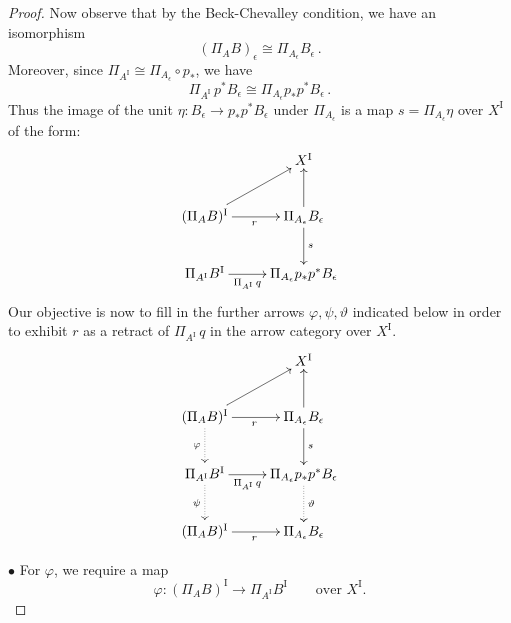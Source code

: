 \documentclass[12pt]{article}
\newcommand{\ra}{\ensuremath{\rightarrow}}
\newcommand{\I}{\ensuremath{\mathrm{I}}}
\theoremstyle{remark}
\theoremstyle{definition}
\begin{document}
\begin{proof}
Now observe that by the Beck-Chevalley condition, we have an isomorphism 
\[
(\Pi_AB )_\epsilon \cong \Pi_{A_\epsilon} B_\epsilon \,.
\]
Moreover, since $\Pi_{A^\I} \cong \Pi_{A_\epsilon} \circ p_*$, we have
\[
 \Pi_{A^\I}\,p^*B_\epsilon \cong \Pi_{A_\epsilon} p_*p^* B_\epsilon \,.
\]
Thus the image of the unit $\eta : B_\epsilon \ra p_*p^* B_\epsilon$ under $\Pi_{A_\epsilon}$ is a map 
$s = \Pi_{A_\epsilon}\eta$ over $X^\I$ of the form:
\begin{equation}\label{diagram:frobenius3}
\xymatrix{
& X^\I  \\
 (\Pi_AB)^\I  \ar[r]_r   \ar[ru] & \Pi_{A_\epsilon}B_\epsilon  \ar[u] \ar[d]^{s}\\
 \Pi_{A^\I}B^\I \ar[r]_-{\Pi_{A^\I}\,q} & \Pi_{A_\epsilon} p_*p^* B_\epsilon
}
\end{equation}
Our objective is now to fill in the further arrows $\varphi, \psi,\vartheta$ indicated below in order to exhibit $r$ as a retract of $\Pi_{A^\I}\,q$ in the arrow category over $X^\I$.
\begin{equation}\label{diagram:frobenius4}
\xymatrix{
& X^\I  \\
 (\Pi_AB)^\I  \ar[r]_r  \ar[ru] \ar@{..>}[d]_\varphi & \Pi_{A_\epsilon}B_\epsilon  \ar[u] \ar[d]^{s}\\
 \Pi_{A^\I}B^\I \ar[r]_-{\Pi_{A^\I}\,q} \ar@{..>}[d]_\psi & \Pi_{A_\epsilon} p_*p^* B_\epsilon \ar@{..>}[d]^\vartheta\\
  (\Pi_AB)^\I  \ar[r]_r  & \Pi_{A_\epsilon}B_\epsilon
}
\end{equation}

\smallskip

\noindent $\bullet$ For $\varphi$, we require a map 
\[
\varphi : (\Pi_AB)^\I \ra \Pi_{A^\I}B^\I \qquad \text{over $X^\I$.}
\]


\end{proof}
\end{document}
